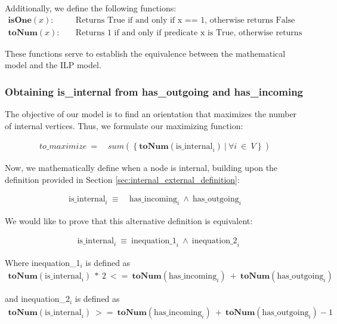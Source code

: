 Additionally, we define the following functions:
\begin{align*}
    \textbf{isOne}(x) : \quad & \text{Returns True if and only if x == 1, otherwise returns False} \\
    \textbf{toNum}(x) : \quad & \text{Returns 1 if and only if predicate x is True, otherwise returns 0}
\end{align*}

These functions serve to establish the equivalence between the mathematical model and the ILP model.

\subsubsection{Obtaining is\_internal from has\_outgoing and has\_incoming}

The objective of our model is to find an orientation that maximizes the number of internal vertices. Thus, we formulate our maximizing function:

\begin{align*}
    to\_maximize~=\quad sum(~\{~\textbf{toNum}(\text{is\_internal}_i)~|~\forall i~\in~V~\}~)
\end{align*}

Now, we mathematically define when a node is internal, building upon the definition provided in Section \ref{sec:internal_external_definition}:

\begin{align}
    \text{is\_internal}_{i}\ \equiv~& \text{has\_incoming}_{i}\ \land    \ \text{has\_outgoing}_{i}\label{eq:is_internal_and}
\end{align}

We would like to prove that this alternative definition is equivalent:

\begin{align}
    &\text{is\_internal}_{i}\ \equiv~ \text{inequation\_1}_{i}\ \land    \ \text{inequation\_2}_{i} \label{eq:is_internal_ineqs}
\end{align}

Where inequation\_1$_i$ is defined as
\begin{align}
    \textbf{toNum}(\text{is\_internal}_{i})~*~2~<=~\textbf{toNum}(\text{has\_incoming}_{i})~+~\textbf{toNum}(\text{has\_outgoing}_{i}) \label{eq:ineq1}
\end{align}

and inequation\_2$_i$ is defined as
\begin{align}
    \textbf{toNum}(\text{is\_internal}_{i})~>=~\textbf{toNum}(\text{has\_incoming}_{i})~+~\textbf{toNum}(\text{has\_outgoing}_{i}) -1\label{eq:ineq2}
\end{align}

